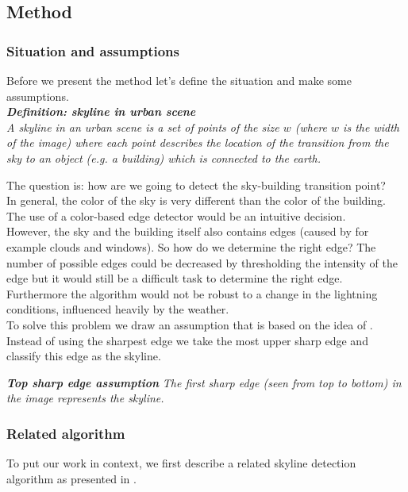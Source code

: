 


\subsection{Method} %
\subsubsection{Situation and assumptions}
Before we present the method let's define the situation and make some
assumptions.\\

\textbf{\emph{Definition: skyline in urban scene}}\\
\emph{A skyline in an urban scene is a set of points of the size $w$ (where $w$ is the
width of the image) where each point describes the location of the
transition from the sky to an object (e.g. a building) which is connected to the
earth.}

The question is: how are we going to detect the sky-building
transition point?\\ 
In general, the color of the sky is very different than the
color of the building. The use of a color-based edge detector would be an
intuitive decision.\\
However, the sky and the building itself also contains edges (caused by for example
clouds and windows). So how do we determine the right edge?
The number of possible edges could be decreased by thresholding the intensity of
the edge but it would still be a difficult task to determine the right edge.
Furthermore the algorithm would not be robust to a change in
the lightning conditions, influenced heavily by the weather.\\

To solve this problem we draw an assumption that is based on the
idea of \cite{Rover}. Instead of using the sharpest edge we take the most upper sharp
edge and classify this edge as the skyline.

\textbf{\emph{Top sharp edge assumption}}
\emph{The first sharp edge (seen from top to bottom) in the image 
represents the skyline.}

\subsubsection{Related algorithm}
To put our work in context, we first describe a related skyline detection algorithm as presented in \cite{Rover}.\\

